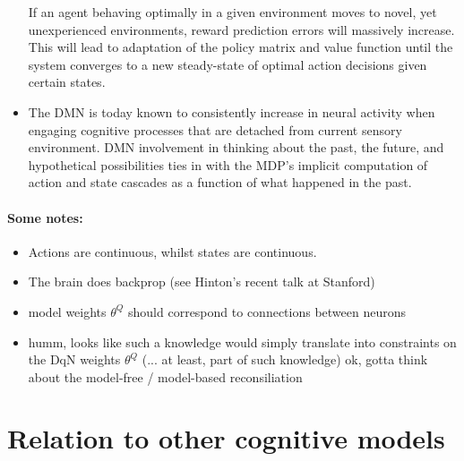 \documentclass{article} %
\begin{document}
\begin{itemize}
  If an agent behaving optimally in a given environment moves
  to novel, yet unexperienced environments, reward prediction errors will
  massively increase. This will lead to adaptation of the policy matrix
  and value function until the system converges to a
  new steady-state of optimal action decisions given certain states.
  \item The DMN is today known to consistently increase in neural
  activity when engaging cognitive processes that are detached from
  current sensory environment. DMN involvement in thinking about the past,
  the future, and hypothetical possibilities ties in with the
  MDP's implicit computation of action and state cascades as a function
  of what happened in the past.
  
\end{itemize}





\paragraph*{Some notes:}
\begin{itemize}
  \item Actions are continuous, whilst states are continuous.
  \item The brain does backprop (see Hinton's recent talk at Stanford)
  \item model weights $\theta^Q$ should correspond to connections between neurons
\item humm, looks like such a knowledge would simply translate into constraints on the DqN weights $\theta^Q$ (... at least, part of such knowledge)
  ok, gotta think about the model-free / model-based reconsiliation
\end{itemize}


\section{Relation to other cognitive models}
\end{document}
